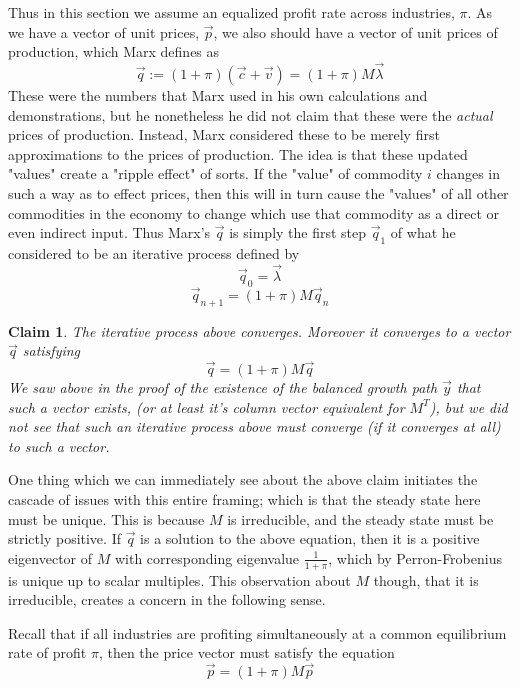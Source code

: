 \documentclass{article}
\theoremstyle{definition}
\theoremstyle{plain}
\theoremstyle{theorem}
\newtheorem{claim}{Claim}[section]
\begin{document}
Thus in this section we assume an equalized profit rate across industries, $\pi$. As we have a vector of unit prices, $\vec{p}$, we also should have a vector of unit prices of production, which Marx defines as 
\[ \vec{q} := (1+\pi)(\vec{c} + \vec{v}) = (1+\pi)M\vec{\lambda} \]
These were the numbers that Marx used in his own calculations and demonstrations, but he nonetheless he did not claim that these were the \textit{actual} prices of production. Instead, Marx considered these to be merely first approximations to the prices of production. The idea is that these updated "values" create a "ripple effect" of sorts. If the "value" of commodity $i$ changes in such a way as to effect prices, then this will in turn cause the "values" of all other commodities in the economy to change which use that commodity as a direct or even indirect input. Thus Marx's $\vec{q}$ is simply the first step $\vec{q}_1$ of what he considered to be an iterative process defined by
\[  \vec{q}_0 = \vec{\lambda} \]
\[ \vec{q}_{n+1} = (1+\pi)M\vec{q}_n \]
\begin{claim}
	The iterative process above converges. Moreover it converges to a vector $\vec{q}$ satisfying
	\[ \vec{q} = (1+\pi)M\vec{q} \]
	We saw above in the proof of the existence of the balanced growth path $\vec{y}$ that such a vector \emph{exists}, (or at least it's column vector equivalent for $M^T$), but we did not see that such an iterative process above must converge (if it converges at all) to such a vector. 
\end{claim} 
One thing which we can immediately see about the above claim initiates the cascade of issues with this entire framing; which is that the steady state here must be unique. This is because $M$ is irreducible, and the steady state must be strictly positive. If $\vec{q}$ is a solution to the above equation, then it is a positive eigenvector of $M$ with corresponding eigenvalue $\frac{1}{1+\pi}$, which by Perron-Frobenius is unique up to scalar multiples. This observation about $M$ though, that it is irreducible, creates a concern in the following sense. \par 
Recall that if all industries are profiting simultaneously at a common equilibrium rate of profit $\pi$, then the price vector must satisfy the equation 
	\[ \vec{p} = (1+\pi)M\vec{p}  \]
\end{document}
